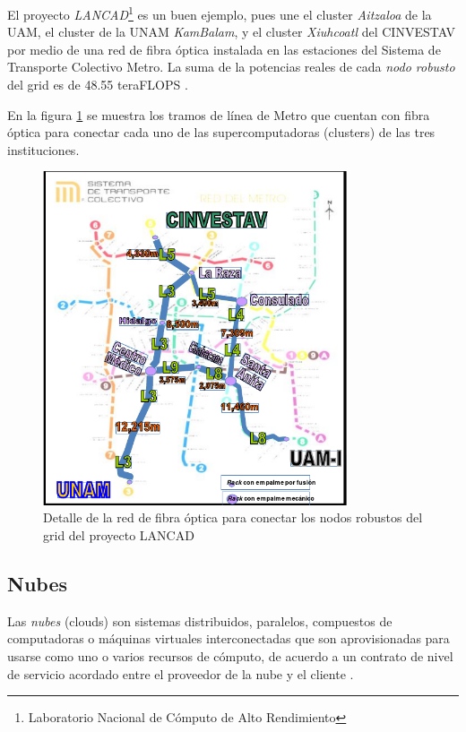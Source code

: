 \documentclass[letterpaper, 12pt]{report}
\begin{document}
El proyecto \emph{LANCAD}\footnote{Laboratorio Nacional de Cómputo de Alto Rendimiento} es un buen ejemplo, pues une el cluster \emph{Aitzaloa} de la UAM, el cluster de la UNAM \emph{KamBalam}, y el cluster \emph{Xiuhcoatl} del CINVESTAV por medio de una red de fibra óptica instalada en las estaciones del Sistema de Transporte Colectivo Metro. La suma de la potencias reales de cada \emph{nodo robusto} del grid es de 48.55 teraFLOPS \cite{lancad2013xiuhcoatl}.

En la figura \ref{fig:LANCAD-mapa-fo} se muestra los tramos de línea de Metro que cuentan con fibra óptica para conectar cada uno de las supercomputadoras (clusters) de las tres instituciones.

\begin{figure}
    \begin{center}
        \includegraphics[width=0.8\textwidth]{imagenes/LANCAD-mapa-fo}
    \end{center}
    \caption{Detalle de la red de fibra óptica para conectar los nodos robustos del grid del proyecto LANCAD}
    \label{fig:LANCAD-mapa-fo}
\end{figure}


\subsection{Nubes}
Las \emph{nubes} (clouds) son sistemas distribuidos, paralelos, compuestos de computadoras o máquinas virtuales interconectadas que son aprovisionadas para usarse como uno o varios recursos de cómputo, de acuerdo a un contrato de nivel de servicio acordado entre el proveedor de la nube y el cliente \cite{buyya2009cloud}. 
\end{document}
